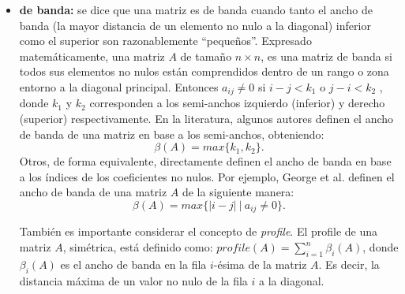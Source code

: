 \begin{itemize}
    \item  \textbf{de banda:}
    se dice que una matriz es de banda cuando tanto el ancho de banda (la mayor distancia de un elemento no nulo a la diagonal) inferior como el superior son razonablemente ``pequeños''.
    Expresado matemáticamente, una matriz $A$ de tamaño $n \times n$, es una matriz de banda si todos sus elementos no nulos están comprendidos dentro de un rango o zona entorno a la diagonal principal. %
    Entonces $a_{ij} \neq 0$ si $i - j < k_1$ o $j - i < k_2$  %
    , donde $k_1$ y $k_2$ corresponden a los semi-anchos izquierdo (inferior) y derecho (superior) respectivamente. 
    En la literatura, algunos autores definen el ancho de banda de una matriz en base a los semi-anchos, obteniendo:
    \begin{equation*}\label{bandwidth}
        \beta(A) = max\{k_1, k_2\}.
    \end{equation*}
    Otros, de forma equivalente, directamente definen el ancho de banda en base a los índices de los coeficientes no nulos. Por ejemplo, George et  al. \cite{comp-sol-of-sparse-linear-systems} definen el ancho de banda de una matriz $A$ de la siguiente manera:
    \begin{equation*}\label{bandwidth}
        \beta(A) = max\{|i -  j|\ |\ a_{ij} \neq 0 \}.
    \end{equation*}
    
    También es importante considerar el concepto de \textit{profile}. El profile de una matriz $A$, simétrica, está definido como: $profile(A) = \sum_{i = 1}^{n} \beta_i (A)$, donde $\beta_i (A)$ es el ancho de banda en la fila $i$-ésima de la matriz $A$. Es decir, la distancia máxima de un valor no nulo de la fila $i$ a la diagonal. 


\end{itemize}
